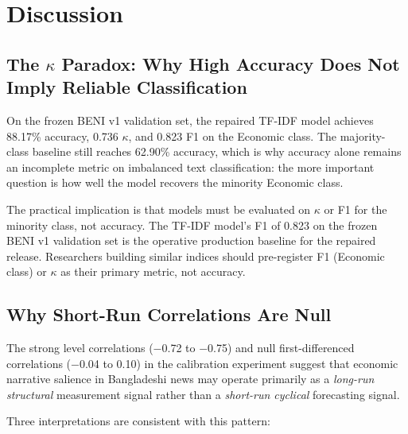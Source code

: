 
\section{Discussion}\label{sec:discussion}

\subsection{\texorpdfstring{The $\kappa$ Paradox}{The kappa Paradox}: Why High Accuracy Does Not Imply Reliable Classification}

On the frozen BENI v1 validation set, the repaired TF-IDF model achieves 88.17\% accuracy, 0.736 $\kappa$, and 0.823 F1 on the Economic class. The majority-class baseline still reaches 62.90\% accuracy, which is why accuracy alone remains an incomplete metric on imbalanced text classification: the more important question is how well the model recovers the minority Economic class.

The practical implication is that models must be evaluated on $\kappa$ or F1 for the minority class, not accuracy. The TF-IDF model's F1 of 0.823 on the frozen BENI v1 validation set is the operative production baseline for the repaired release. Researchers building similar indices should pre-register F1 (Economic class) or $\kappa$ as their primary metric, not accuracy.

\subsection{Why Short-Run Correlations Are Null}

The strong level correlations ($-$0.72 to $-$0.75) and null first-differenced correlations ($-$0.04 to 0.10) in the calibration experiment suggest that economic narrative salience in Bangladeshi news may operate primarily as a \textit{long-run structural} measurement signal rather than a \textit{short-run cyclical} forecasting signal.

Three interpretations are consistent with this pattern:

